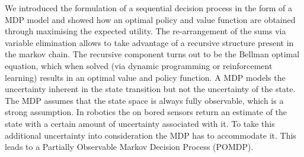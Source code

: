 We introduced the formulation of a sequential decision process in the form of a MDP model and showed how an optimal policy 
and value function are obtained through maximising the expected utility. The re-arrangement of the sums via
variable elimination allows to take advantage of a recursive structure present in the markov chain. The recursive component 
turns out to be the Bellman optimal equation, which when solved (via dynamic programming or reinforcement learning) results 
in an optimal value and policy function. A MDP models the uncertainty inherent in the state transition but not the uncertainty 
of the state. The MDP assumes that the state space is always fully observable, which is a strong assumption. In robotics the 
on bored sensors return an estimate of the state with a certain amount of uncertainty associated with it. To take this additional
uncertainty into consideration the MDP has to accommodate it. This leads to a Partially Observable Markov Decision Process (POMDP).



